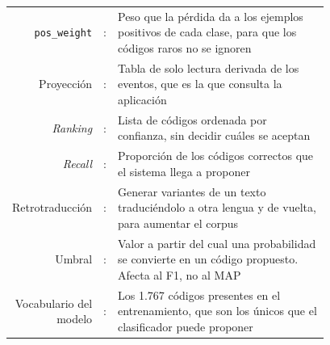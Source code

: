 \begin{tabular}{r r p{0.78\linewidth}}
\texttt{pos\_weight} & : & Peso que la pérdida da a los ejemplos positivos de cada clase, para que los códigos raros no se ignoren \\
Proyección & : & Tabla de solo lectura derivada de los eventos, que es la que consulta la aplicación \\
\emph{Ranking} & : & Lista de códigos ordenada por confianza, sin decidir cuáles se aceptan \\
\emph{Recall} & : & Proporción de los códigos correctos que el sistema llega a proponer \\
Retrotraducción & : & Generar variantes de un texto traduciéndolo a otra lengua y de vuelta, para aumentar el corpus \\
Umbral & : & Valor a partir del cual una probabilidad se convierte en un código propuesto. Afecta al F1, no al MAP \\
Vocabulario del modelo & : & Los 1.767 códigos presentes en el entrenamiento, que son los únicos que el clasificador puede proponer \\
\end{tabular}
